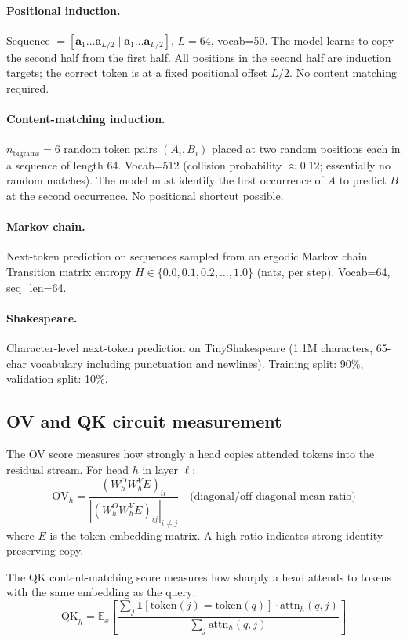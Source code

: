 \documentclass[final]{article}
\begin{document}
\paragraph{Positional induction.}
Sequence $= [\mathbf{a}_1 \ldots \mathbf{a}_{L/2} \mid \mathbf{a}_1 \ldots \mathbf{a}_{L/2}]$,
$L=64$, vocab=50. The model learns to copy the second half from the first half.
All positions in the second half are induction targets; the correct token is at
a fixed positional offset $L/2$. No content matching required.

\paragraph{Content-matching induction.}
$n_\text{bigrams}=6$ random token pairs $(A_i, B_i)$ placed at two random
positions each in a sequence of length 64. Vocab=512 (collision probability
$\approx 0.12$; essentially no random matches). The model must identify the
first occurrence of $A$ to predict $B$ at the second occurrence. No positional
shortcut possible.

\paragraph{Markov chain.}
Next-token prediction on sequences sampled from an ergodic Markov chain.
Transition matrix entropy $H \in \{0.0, 0.1, 0.2, \ldots, 1.0\}$ (nats, per
step). Vocab=64, seq\_len=64.

\paragraph{Shakespeare.}
Character-level next-token prediction on TinyShakespeare (1.1M characters, 65-char
vocabulary including punctuation and newlines). Training split: 90\%, validation
split: 10\%.

\subsection{OV and QK circuit measurement}

The OV score measures how strongly a head copies attended tokens into the
residual stream. For head $h$ in layer $\ell$:
\[
  \text{OV}_h = \frac{(W^O_h W^V_h E)_{ii}}{|(W^O_h W^V_h E)_{ij}|_{i \neq j}} \quad \text{(diagonal/off-diagonal mean ratio)}
\]
where $E$ is the token embedding matrix. A high ratio indicates strong
identity-preserving copy.

The QK content-matching score measures how sharply a head attends to tokens
with the same embedding as the query:
\[
  \text{QK}_h = \mathbb{E}_x \left[ \frac{\sum_j \mathbf{1}[\text{token}(j) = \text{token}(q)] \cdot \text{attn}_{h}(q, j)}{\sum_j \text{attn}_{h}(q, j)} \right]
\]
\end{document}
